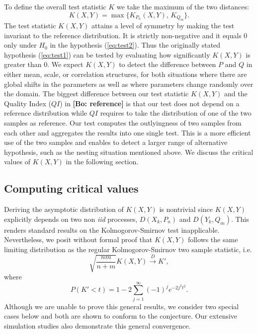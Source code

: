 \documentclass[12pt]{article}
\newcommand{\bl}[1]{\color{Red}\textbf{[Bo: #1]}\normalcolor}
\begin{document}
To define the overall test statistic $K$ we take the maximum of the two distances:
\begin{equation}\label{eq:ts}
K(X, Y) = \max\{K_{P_n}(X, Y) \text{, } K_{Q_m}\}.
\end{equation}
The test statistic $K(X, Y)$ attains a level of symmetry by making the test invariant to the reference distribution. It is strictly non-negative and it equals 0 only under $H_0$ in the hypothesis (\ref{eq:test2}). Thus the originally stated hypothesis (\ref{eq:test1}) can be tested by evaluating how significantly $K(X, Y)$ is greater than 0. 
We expect $K(X, Y)$ to detect the difference between $P$ and $Q$ in either mean, scale, or correlation structures, for both situations where there are global shifts in the parameters as well as where parameters change randomly over the domain. The biggest difference between our test statistic $K(X, Y)$ and the Quality Index ($QI$) in \bl{reference} is that our test does not depend on a reference distribution while $QI$ requires to take the distribution of one of the two samples as reference. Our test computes the outlyingness of two samples from each other and aggregates the results into one single test. This is a more efficient use of the two samples and enables to detect a larger range of alternative hypothesis, such as the nesting situation mentioned above. We discuss the critical values of $K(X, Y)$ in the following section. 

 


\subsection{Computing critical values} \label{critical}
Deriving the asymptotic distribution of $K(X, Y)$ is nontrivial since $K(X, Y)$ explicitly depends on two non \textit{iid} processes, $D(X_k, P_n)$ and $D(Y_k, Q_m)$. This renders standard results on the Kolmogorov-Smirnov test inapplicable. Nevertheless, we posit without formal proof that $K(X, Y)$ follows the same limiting distribution as the regular Kolmogorov-Smirnov two sample statistic, i.e.
\[
\sqrt{\frac{nm}{n+m}} K(X, Y) \xrightarrow{D} K',
\]
where
\[
P(K' < t) = 1 - 2\sum_{j=1}^{\infty}(-1)^je^{-2j^2t^2}.
\]
Although we are unable to prove this general results, we consider two special cases below and both are shown to conform to the conjecture. Our extensive simulation studies also demonstrate this general convergence. 
\end{document}
